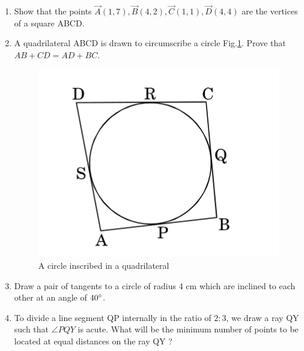 \documentclass{article}
\begin{document}
\begin{enumerate}
\item Show that the points $\vec{A}(1,7), \vec{B}(4,2), \vec{C}(1,1), \vec{D}(4,4)$ are the vertices of a square ABCD. 

\item A quadrilateral ABCD is drawn to circumscribe a circle Fig.\ref{fig:2}. Prove that $ AB + CD = AD + BC. $

	\begin{figure}[h]
	\centering
	\includegraphics[width=\columnwidth]{figs/2.jpg}
	\caption{A circle inscribed in a quadrilateral}
	\label{fig:2}
	\end{figure}

\item Draw a pair of tangents to a circle of radius 4 cm which are inclined to each other at an angle of $40\degree$. 

\item To divide a line segment QP internally in the ratio of $2 : 3$, we draw a ray QY such that $\angle PQY$ is acute. What will be the minimum number of points to be located at equal distances on the ray QY ? 


\end{enumerate}
\end{document}
